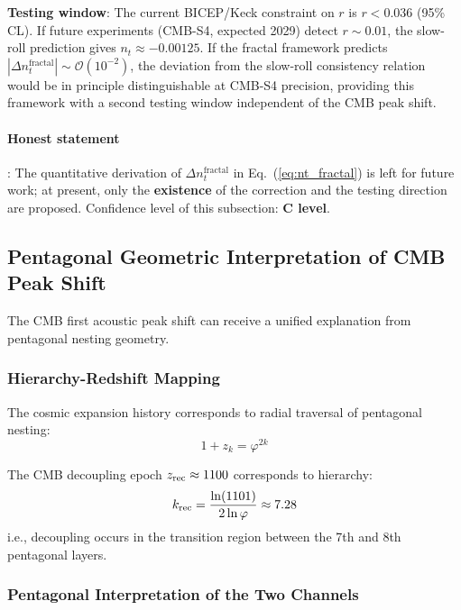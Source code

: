 \documentclass[12pt,a4paper,twocolumn]{article}
\renewcommand{\phi}{\varphi}
\begin{document}
\textbf{Testing window}: The current BICEP/Keck constraint on $r$ is $r < 0.036$ (95\% CL). If future experiments (CMB-S4, expected 2029) detect $r \sim 0.01$, the slow-roll prediction gives $n_t \approx -0.00125$. If the fractal framework predicts $|\Delta n_t^{\text{fractal}}| \sim \mathcal{O}(10^{-2})$, the deviation from the slow-roll consistency relation would be in principle distinguishable at CMB-S4 precision, providing this framework with a second testing window independent of the CMB peak shift.

\paragraph{Honest statement}: The quantitative derivation of $\Delta n_t^{\text{fractal}}$ in Eq.~(\ref{eq:nt_fractal}) is left for future work; at present, only the \textbf{existence} of the correction and the testing direction are proposed. Confidence level of this subsection: \textbf{C level}.

\subsection{Pentagonal Geometric Interpretation of CMB Peak Shift}
\label{subsec:cmb_pentagon}

The CMB first acoustic peak shift can receive a unified explanation from pentagonal nesting geometry.

\subsubsection{Hierarchy-Redshift Mapping}

The cosmic expansion history corresponds to radial traversal of pentagonal nesting:
\begin{equation}
1+z_k = \phi^{2k}
\end{equation}

The CMB decoupling epoch $z_{\rm rec} \approx 1100$ corresponds to hierarchy:
\begin{equation}
k_{\rm rec} = \frac{\ln(1101)}{2\ln\phi} \approx 7.28
\end{equation}
i.e., decoupling occurs in the transition region between the 7th and 8th pentagonal layers.

\subsubsection{Pentagonal Interpretation of the Two Channels}
\end{document}
